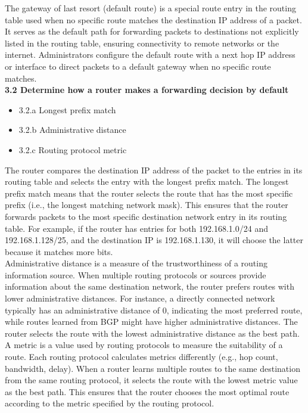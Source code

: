 \documentclass{article}
\begin{document}
	The gateway of last resort (default route) is a special route entry in the routing table used when no specific route matches the destination IP address of a packet. It serves as the default path for forwarding packets to destinations not explicitly listed in the routing table, ensuring connectivity to remote networks or the internet. Administrators configure the default route with a next hop IP address or interface to direct packets to a default gateway when no specific route matches.\\
  
\textbf{3.2 Determine how a router makes a forwarding decision by default}
\begin{itemize}
\item 3.2.a Longest prefix match
\item 3.2.b Administrative distance
\item 3.2.c Routing protocol metric
\end{itemize}

	The router compares the destination IP address of the packet to the entries in its routing table and selects the entry with the longest prefix match. The longest prefix match means that the router selects the route that has the most specific prefix (i.e., the longest matching network mask). This ensures that the router forwards packets to the most specific destination network entry in its routing table. For example, if the router has entries for both 192.168.1.0/24 and 192.168.1.128/25, and the destination IP is 192.168.1.130, it will choose the latter because it matches more bits.\\

	Administrative distance is a measure of the trustworthiness of a routing information source. When multiple routing protocols or sources provide information about the same destination network, the router prefers routes with lower administrative distances. For instance, a directly connected network typically has an administrative distance of 0, indicating the most preferred route, while routes learned from BGP might have higher administrative distances. The router selects the route with the lowest administrative distance as the best path.\\
	
	A metric is a value used by routing protocols to measure the suitability of a route. Each routing protocol calculates metrics differently (e.g., hop count, bandwidth, delay). When a router learns multiple routes to the same destination from the same routing protocol, it selects the route with the lowest metric value as the best path. This ensures that the router chooses the most optimal route according to the metric specified by the routing protocol.\\
  
\end{document}
